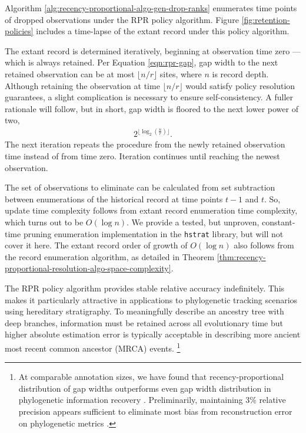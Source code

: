 Algorithm \ref{alg:recency-proportional-algo-gen-drop-ranks} enumerates time points of dropped observations under the RPR policy algorithm.
Figure \ref{fig:retention-policies} includes a time-lapse of the extant record under this policy algorithm.

The extant record is determined iteratively, beginning at observation time zero --- which is always retained.
Per Equation \ref{eqn:rpr-gap}, gap width to the next retained observation can be at most $\lfloor n/r \rfloor$ sites, where $n$ is record depth.
Although retaining the observation at time $\lfloor n/r \rfloor$ would satisfy policy resolution guarantees, a slight complication is necessary to ensure self-consistency.
A fuller rationale will follow, but in short, gap width is floored to the next lower power of two,
\begin{align*}
  2^{\lfloor \log_{2}\left(\frac{n}{r}\right) \rfloor}.
\end{align*}
The next iteration repeats the procedure from the newly retained observation time instead of from time zero.
Iteration continues until reaching the newest observation.

The set of observations to eliminate can be calculated from set subtraction between enumerations of the historical record at time points $t-1$ and $t$.
So, update time complexity follows from extant record enumeration time complexity, which turns out to be $O(\log n)$.
We provide a tested, but unproven, constant-time pruning enumeration implementation in the \texttt{hstrat} library, but will not cover it here. %
The extant record order of growth of $O(\log n)$ also follows from the record enumeration algorithm, as detailed in Theorem \ref{thm:recency-proportional-resolution-algo-space-complexity}.

The RPR policy algorithm provides stable relative accuracy indefinitely.
This makes it particularly attractive in applications to phylogenetic tracking scenarios using hereditary stratigraphy.
To meaningfully describe an ancestry tree with deep branches, information must be retained across all evolutionary time but higher absolute estimation error is typically acceptable in describing more ancient most recent common ancestor (MRCA) events.%
\footnote{%
At comparable annotation sizes, we have found that recency-proportional distribution of gap widths outperforms even gap width distribution in phylogenetic information recovery \citep{moreno2022hereditary}.
Preliminarily, maintaining 3\% relative precision appears sufficient to eliminate most bias from reconstruction error on phylogenetic metrics \citep{moreno2023toward}.
}

